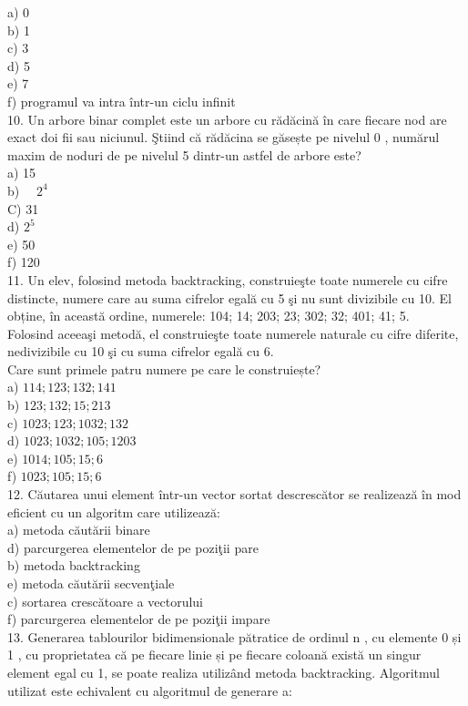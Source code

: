 \documentclass[10pt]{article}
\begin{document}
a) 0\\
b) 1\\
c) 3\\
d) 5\\
e) 7\\
f) programul va intra într-un ciclu infinit\\
10. Un arbore binar complet este un arbore cu rădăcină în care fiecare nod are exact doi fii sau niciunul. Ştiind că rădăcina se găsește pe nivelul 0 , numărul maxim de noduri de pe nivelul 5 dintr-un astfel de arbore este?\\
a) 15\\
b) $\quad 2^{4}$\\
C) 31\\
d) $2^{5}$\\
e) 50\\
f) 120\\
11. Un elev, folosind metoda backtracking, construieşte toate numerele cu cifre distincte, numere care au suma cifrelor egală cu 5 şi nu sunt divizibile cu 10. El obține, în această ordine, numerele: 104; 14; 203; 23; 302; 32; 401; 41; 5.\\
Folosind aceeaşi metodă, el construieşte toate numerele naturale cu cifre diferite, nedivizibile cu 10 şi cu suma cifrelor egală cu 6.\\
Care sunt primele patru numere pe care le construiește?\\
a) $114 ; 123 ; 132 ; 141$\\
b) $123 ; 132 ; 15 ; 213$\\
c) $1023 ; 123 ; 1032 ; 132$\\
d) $1023 ; 1032 ; 105 ; 1203$\\
e) $1014 ; 105 ; 15 ; 6$\\
f) $1023 ; 105 ; 15 ; 6$\\
12. Căutarea unui element într-un vector sortat descrescător se realizează în mod eficient cu un algoritm care utilizează:\\
a) metoda căutării binare\\
d) parcurgerea elementelor de pe poziţii pare\\
b) metoda backtracking\\
e) metoda căutării secvenţiale\\
c) sortarea crescătoare a vectorului\\
f) parcurgerea elementelor de pe poziţii impare\\
13. Generarea tablourilor bidimensionale pătratice de ordinul n , cu elemente 0 și 1 , cu proprietatea că pe fiecare linie și pe fiecare coloană există un singur element egal cu 1, se poate realiza utilizând metoda backtracking. Algoritmul utilizat este echivalent cu algoritmul de generare a:\\
\end{document}
